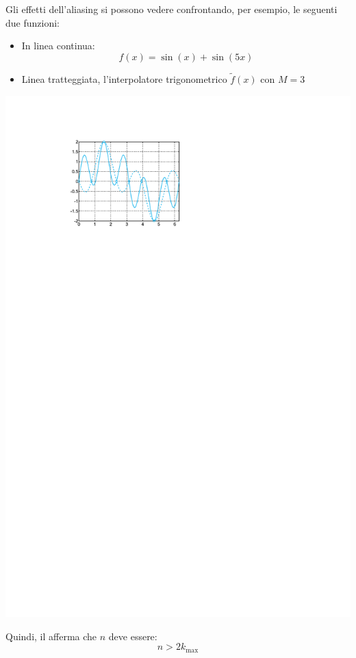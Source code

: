 \begin{examplebox}[: aliasing]
	Gli effetti dell'aliasing si possono vedere confrontando, per esempio, le seguenti due funzioni:
	\begin{itemize}
		\item In linea continua:
		\begin{equation*}
			f\left(x\right) = \sin\left(x\right) + \sin\left(5x\right)
		\end{equation*}
		
		\item Linea tratteggiata, l'interpolatore trigonometrico $\tilde{f}\left(x\right)$ con $M=3$
	\end{itemize}
	
	\begin{center}
		\includegraphics[width=.5\textwidth]{img/aliasing-1.pdf}
	\end{center}
\end{examplebox}

\noindent
Quindi, il  afferma che $n$ deve essere:
\begin{equation}
	n > 2k_{\max}
\end{equation}